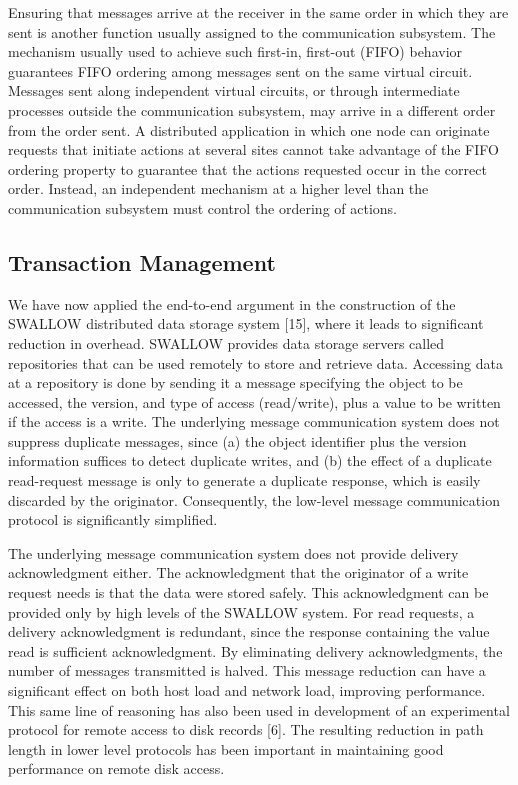 \documentclass[a4paper,11pt,notitlepage,twoside,openright]{article}
\begin{document}
Ensuring that messages arrive at the receiver in the same order in which
they are sent is another function usually assigned to the communication
subsystem. The mechanism usually used to achieve such first-in,
first-out (FIFO) behavior guarantees FIFO ordering among messages sent
on the same virtual circuit. Messages sent along independent virtual
circuits, or through intermediate processes outside the communication
subsystem, may arrive in a different order from the order sent. A
distributed application in which one node can originate requests that
initiate actions at several sites cannot take advantage of the FIFO
ordering property to guarantee that the actions requested occur in the
correct order. Instead, an independent mechanism at a higher level than
the communication subsystem must control the ordering of actions.

\hypertarget{transaction-management}{%
\subsection{Transaction Management}\label{transaction-management}}

We have now applied the end-to-end argument in the construction of the
SWALLOW distributed data storage system {[}15{]}, where it leads to
significant reduction in overhead. SWALLOW provides data storage servers
called repositories that can be used remotely to store and retrieve
data. Accessing data at a repository is done by sending it a message
specifying the object to be accessed, the version, and type of access
(read/write), plus a value to be written if the access is a write. The
underlying message communication system does not suppress duplicate
messages, since (a) the object identifier plus the version information
suffices to detect duplicate writes, and (b) the effect of a duplicate
read-request message is only to generate a duplicate response, which is
easily discarded by the originator. Consequently, the low-level message
communication protocol is significantly simplified.

The underlying message communication system does not provide delivery
acknowledgment either. The acknowledgment that the originator of a write
request needs is that the data were stored safely. This acknowledgment
can be provided only by high levels of the SWALLOW system. For read
requests, a delivery acknowledgment is redundant, since the response
containing the value read is sufficient acknowledgment. By eliminating
delivery acknowledgments, the number of messages transmitted is halved.
This message reduction can have a significant effect on both host load
and network load, improving performance. This same line of reasoning has
also been used in development of an experimental protocol for remote
access to disk records {[}6{]}. The resulting reduction in path length
in lower level protocols has been important in maintaining good
performance on remote disk access.
\end{document}

